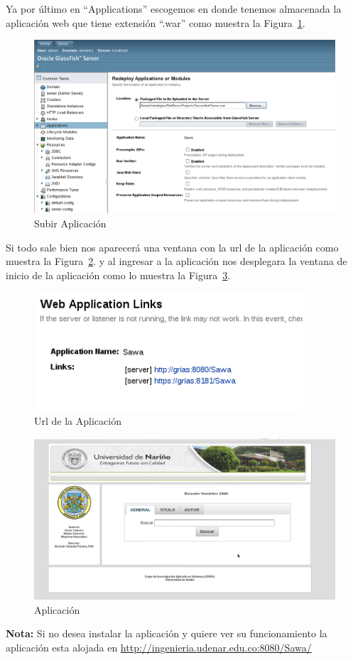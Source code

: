 Ya por último en ``Applications'' escogemos en donde tenemos almacenada la aplicación web 
que tiene extensión ``.war'' como muestra la  Figura~\ref{figura:m4}.

\begin{figure}[!ht]
\begin{center}
\includegraphics[width=13cm]{pictures/m4.png}
\end{center}
\caption{Subir Aplicación} \label{figura:m4}
\end{figure}

Si todo sale bien nos aparecerá una ventana con la url de la aplicación 
como muestra la Figura~\ref{figura:m5}. y al 
ingresar a la aplicación nos desplegara la ventana de inicio de la aplicación como lo muestra la
Figura~\ref{figura:m6}.

\begin{figure}[!ht]
\begin{center}
\includegraphics[width=10cm]{pictures/m5.png}
\end{center}
\caption{Url de la Aplicación} \label{figura:m5}
\end{figure}

\begin{figure}[!ht]
\begin{center}
\includegraphics[width=13cm]{pictures/m6.png}
\end{center}
\caption{Aplicación} \label{figura:m6}
\end{figure}

\textbf{Nota:} Si no desea instalar la aplicación y quiere ver su funcionamiento la aplicación esta alojada en \url{http://ingenieria.udenar.edu.co:8080/Sawa/}
